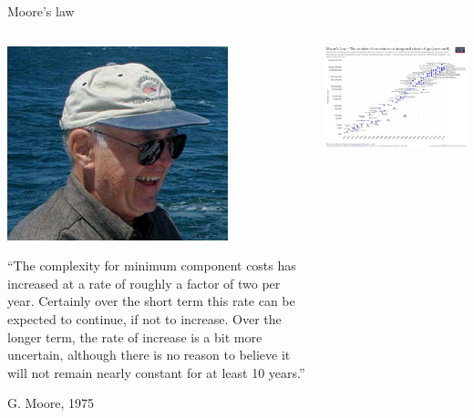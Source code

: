 \documentclass[xcolor={svgnames,usenames}]{beamer}
\begin{document}
\begin{frame}{Moore's law}
	\begin{columns}
		\begin{column}{0.4\columnwidth}
		\centering
		\includegraphics[width=0.3\columnwidth]{Gordon_Moore.jpg}
		
		{\small
			``The complexity for minimum component costs has increased at a rate of roughly a factor of two per year. Certainly over the short term this rate can be expected to continue, if not to increase. Over the longer term, the rate of increase is a bit more uncertain, although there is no reason to believe it will not remain nearly constant for at least 10 years.''
		}
	
		{\flushright G. Moore, 1975}
		\end{column}
	\begin{column}{0.6\columnwidth}
		\centering
		\includegraphics[width=\columnwidth]{mooreslawoftransistors.png}
		
	\end{column}
	\end{columns}
\end{frame}
\end{document}
